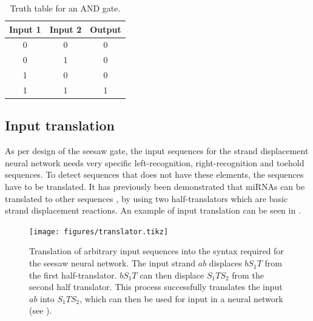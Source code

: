 \begin{table}[h]
\centering
\begin{tabular}{ccc}
  \hline
\multicolumn{1}{l}{\textbf{Input 1}} & \multicolumn{1}{l}{\textbf{Input 2}} & \multicolumn{1}{l}{\textbf{Output}} \\
\hline
0                                    & 0                                    & 0                                   \\
0                                    & 1                                    & 0                                   \\
1                                    & 0                                    & 0                                   \\
1                                    & 1                                    & 1 \\
\hline
\end{tabular}
\caption{Truth table for an AND gate.}
\label{and_table}
\end{table}

\subsection{Input translation}

As per design of the seesaw gate, the input sequences for the strand displacement neural network needs very specific left-recognition, right-recognition and toehold sequences. To detect sequences that does not have these elements, the sequences have to be translated. It has previously been demonstrated that miRNAs can be translated to other sequences \cite{Picuri2009}, by using two half-translators which are basic strand displacement reactions. An example of input translation can be seen in .

\begin{figure}[h]
\texttt{[image: figures/translator.tikz]}
\caption{Translation of arbitrary input sequences into the syntax required for the seesaw neural network. The input strand $ab$ displaces $bS_1T$ from the first half-translator. $bS_1T$ can then displace $S_1TS_2$ from the second half translator. This process successfully translates the input $ab$ into $S_1TS_2$, which can then be used for input in a neural network (see ).}
\label{translator}
\end{figure}
